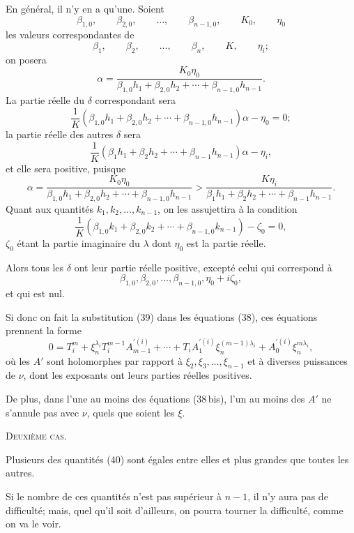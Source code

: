 \documentclass[11pt]{article}
\begin{document}
En général, il n’y en a qu’une. Soient
\[
\beta_{1,0},\qquad \beta_{2,0},\qquad \ldots,\qquad \beta_{n-1,0},\qquad K_0,\qquad \eta_0
\]
les valeurs correspondantes de
\[
\beta_1,\qquad \beta_2,\qquad \ldots,\qquad \beta_n,\qquad K,\qquad \eta_i;
\]
on posera
\[
\alpha=\frac{K_0\eta_0}{\beta_{1,0}h_1+\beta_{2,0}h_2+\cdots+\beta_{n-1,0}h_{n-1}}.
\]
La partie réelle du $\delta$ correspondant sera
\[
\frac1K(\beta_{1,0}h_1+\beta_{2,0}h_2+\cdots+\beta_{n-1,0}h_{n-1})\alpha-\eta_0=0;
\]
la partie réelle des autres $\delta$ sera
\begin{equation*}\tag{41}
\frac1K(\beta_1h_1+\beta_2h_2+\cdots+\beta_{n-1}h_{n-1})\alpha-\eta_i,
\end{equation*}
et elle sera positive, puisque
\[
\alpha=\frac{K_0\eta_0}{\beta_{1,0}h_1+\beta_{2,0}h_2+\cdots+\beta_{n-1,0}h_{n-1}}
>
\frac{K\eta_i}{\beta_1h_1+\beta_2h_2+\cdots+\beta_{n-1}h_{n-1}}.
\]
Quant aux quantités $k_1,k_2,\ldots,k_{n-1}$, on les assujettira à la condition
\[
\frac1K(\beta_{1,0}k_1+\beta_{2,0}k_2+\cdots+\beta_{n-1,0}k_{n-1})-\zeta_0=0,
\]
$\zeta_0$ étant la partie imaginaire du $\lambda$ dont $\eta_0$ est la partie réelle.

Alors tous les $\delta$ ont leur partie réelle positive, excepté celui qui correspond à
\[
\beta_{1,0},\beta_{2,0},\ldots,\beta_{n-1,0},\eta_0+i\zeta_0,
\]
et qui est nul.

Si donc on fait la substitution (39) dans les équations (38), ces équations prennent la forme
\begin{equation*}\tag{38\,bis}
0=T_i^m+\xi_n^{\lambda_i}T_i^{m-1}A_{m-1}^{\prime(i)}+\cdots+T_iA_1^{\prime(i)}\xi_n^{(m-1)\lambda_i}+A_0^{\prime(i)}\xi_n^{m\lambda_i},
\end{equation*}
où les $A'$ sont holomorphes par rapport à $\xi_2,\xi_3,\ldots,\xi_{n-1}$ et à diverses puissances de $\nu$, dont les exposants ont leurs parties réelles positives.

De plus, dans l’une au moins des équations (38\,bis), l’un au moins des $A'$ ne s’annule pas avec $\nu$, quels que soient les $\xi$.

\begin{center}
{\scshape Deuxième cas.}
\end{center}

Plusieurs des quantités (40) sont égales entre elles et plus grandes que toutes les autres.

Si le nombre de ces quantités n’est pas supérieur à $n-1$, il n’y aura pas de difficulté; mais, quel qu’il soit d’ailleurs, on pourra tourner la difficulté, comme on va le voir.
\end{document}

